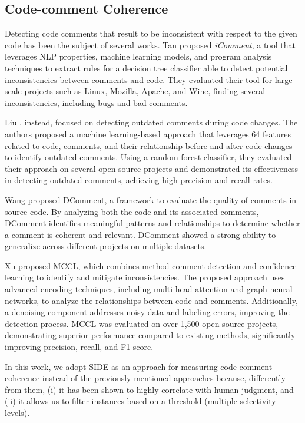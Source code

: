 \subsection{Code-comment Coherence}
Detecting code comments that result to be inconsistent with respect to the given code has been the subject of several works.
Tan \etal \cite{tan2007icomment} proposed \textit{iComment}, a tool that leverages NLP properties, machine learning models, and program analysis techniques to extract rules for a decision tree classifier able to detect potential inconsistencies between comments and code. They evaluated their tool for large-scale projects such as Linux, Mozilla, Apache, and Wine, finding several inconsistencies, including bugs and bad comments.

Liu \etal \cite{liu2018automatic}, instead, focused on detecting outdated comments during code changes.
The authors proposed a machine learning-based approach that leverages 64 features related to code, comments, and their relationship before and after code changes to identify outdated comments. Using a random forest classifier, they evaluated their approach on several open-source projects and demonstrated its effectiveness in detecting outdated comments, achieving high precision and recall rates.

Wang \etal \cite{wang2019deep} proposed DComment, a framework to evaluate the quality of comments in source code. By analyzing both the code and its associated comments, DComment identifies meaningful patterns and relationships to determine whether a comment is coherent and relevant. DComment showed a strong ability to generalize across different projects on multiple datasets.

Xu \etal \cite{xu2024code} proposed MCCL, which combines method comment detection and confidence learning to identify and mitigate inconsistencies. The proposed approach uses advanced encoding techniques, including multi-head attention and graph neural networks, to analyze the relationships between code and comments. Additionally, a denoising component addresses noisy data and labeling errors, improving the detection process. MCCL was evaluated on over 1,500 open-source projects, demonstrating superior performance compared to existing methods, significantly improving precision, recall, and F1-score.

In this work, we adopt SIDE \cite{mastropaolo2024evaluating} as an approach for measuring code-comment coherence instead of the previously-mentioned approaches because, differently from them, (i) it has been shown to highly correlate with human judgment, and (ii) it allows us to filter instances based on a threshold (multiple selectivity levels).
